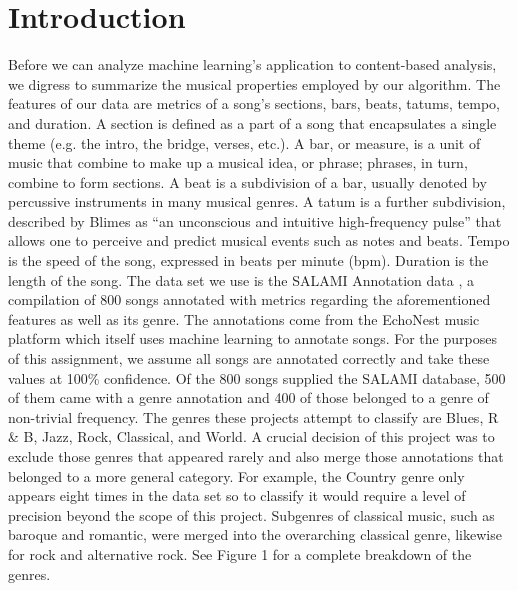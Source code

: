 \documentclass[11pt, twocolumn]{article}
\begin{document}
\section{Introduction}
    Before we can analyze machine learning’s application to content-based analysis, we digress to summarize the musical properties employed by our algorithm. The features of our data are metrics of a song’s sections, bars, beats, tatums, tempo, and duration. A section is defined as a part of a song that encapsulates a single theme (e.g. the intro, the bridge, verses, etc.). A bar, or measure, is a unit of music that combine to make up a musical idea, or phrase; phrases, in turn, combine to form sections. A beat is a subdivision of a bar, usually denoted by percussive instruments in many musical genres. A tatum is a further subdivision, described by Blimes \cite{blimes} as “an unconscious and intuitive high-frequency pulse” that allows one to perceive and predict musical events such as notes and beats. Tempo is the speed of the song, expressed in beats per minute (bpm). Duration is the length of the song.
    The data set we use is the SALAMI Annotation data \cite{mcgill}, a compilation of 800 songs annotated with metrics regarding the aforementioned features as well as its genre. The annotations come from the EchoNest music platform which itself uses machine learning to annotate songs. For the purposes of this assignment, we assume all songs are annotated correctly and take these values at 100\% confidence.
    Of the 800 songs supplied the SALAMI database, 500 of them came with a genre  annotation and 400 of those belonged to a genre of non-trivial frequency. The genres these projects attempt to classify are Blues, R \& B, Jazz, Rock, Classical, and World. A crucial decision of this project was to exclude those genres that appeared rarely and also merge those annotations that belonged to a more general category. For example, the Country genre only appears eight times in the data set so to classify it would require a level of precision beyond the scope of this project. Subgenres of classical music, such as baroque and romantic, were merged into the overarching classical genre, likewise for rock and alternative rock. See Figure 1 for a complete breakdown of the genres.
\end{document}
